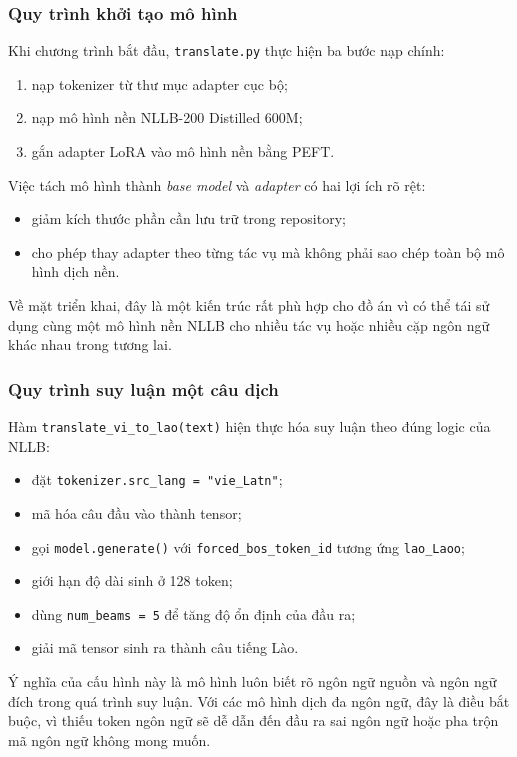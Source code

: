 \subsubsection{Quy trình khởi tạo mô hình}

Khi chương trình bắt đầu, \texttt{translate.py} thực hiện ba bước nạp chính:
\begin{enumerate}
    \item nạp tokenizer từ thư mục adapter cục bộ;
    \item nạp mô hình nền NLLB-200 Distilled 600M;
    \item gắn adapter LoRA vào mô hình nền bằng PEFT.
\end{enumerate}

Việc tách mô hình thành \textit{base model} và \textit{adapter} có hai lợi ích rõ rệt:
\begin{itemize}
    \item giảm kích thước phần cần lưu trữ trong repository;
    \item cho phép thay adapter theo từng tác vụ mà không phải sao chép toàn bộ mô hình
    dịch nền.
\end{itemize}

Về mặt triển khai, đây là một kiến trúc rất phù hợp cho đồ án vì có thể tái sử dụng cùng một
mô hình nền NLLB cho nhiều tác vụ hoặc nhiều cặp ngôn ngữ khác nhau trong tương lai.

\subsubsection{Quy trình suy luận một câu dịch}

Hàm \texttt{translate\_vi\_to\_lao(text)} hiện thực hóa suy luận theo đúng logic của
NLLB:
\begin{itemize}
    \item đặt \texttt{tokenizer.src\_lang = "vie\_Latn"};
    \item mã hóa câu đầu vào thành tensor;
    \item gọi \texttt{model.generate()} với \texttt{forced\_bos\_token\_id} tương ứng
    \texttt{lao\_Laoo};
    \item giới hạn độ dài sinh ở 128 token;
    \item dùng \texttt{num\_beams = 5} để tăng độ ổn định của đầu ra;
    \item giải mã tensor sinh ra thành câu tiếng Lào.
\end{itemize}

Ý nghĩa của cấu hình này là mô hình luôn biết rõ ngôn ngữ nguồn và ngôn ngữ đích trong
quá trình suy luận. Với các mô hình dịch đa ngôn ngữ, đây là điều bắt buộc, vì thiếu token
ngôn ngữ sẽ dễ dẫn đến đầu ra sai ngôn ngữ hoặc pha trộn mã ngôn ngữ không mong muốn.

